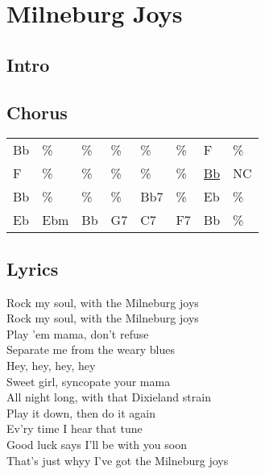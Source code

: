 \section{Milneburg Joys}


\subsection*{Intro}


\subsection*{Chorus}


\begin{tabular}{l l l l l l l l}
Bb & \% & \% & \% & \% & \% & F & \% \\ 
F & \% & \% & \% & \% & \% & \underline{Bb} & NC \\ 
Bb & \% & \% & \% & Bb7 & \% & Eb & \% \\ 
Eb & Ebm & Bb & G7 & C7 & F7 & Bb & \% \\ 
\end{tabular}


\subsection*{Lyrics}


Rock my soul, with the Milneburg joys \\ 
Rock my soul, with the Milneburg joys \\ 
Play 'em mama, don't refuse \\ 
Separate me from the weary blues \\ 
Hey, hey, hey, hey \\ 
Sweet girl, syncopate your mama \\ 
All night long, with that Dixieland strain \\ 
Play it down, then do it again \\ 
Ev'ry time I hear that tune \\ 
Good luck says I'll be with you soon \\ 
That's just whyy I've got the Milneburg joys \\ 
